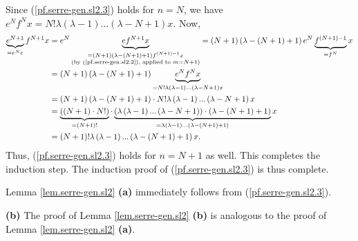 \documentclass[etingof-lie.tex]{subfiles}
\begin{document}
Since (\ref{pf.serre-gen.sl2.3}) holds for $n=N$, we have $e^{N}%
f^{N}x=N!\lambda\left(  \lambda-1\right)  ...\left(  \lambda-N+1\right)  x$.
Now,%
\begin{align*}
\underbrace{e^{N+1}}_{=e^{N}e}f^{N+1}x  &  =e^{N}\underbrace{ef^{N+1}%
x}_{\substack{=\left(  N+1\right)  \left(  \lambda-\left(  N+1\right)
+1\right)  f^{\left(  N+1\right)  -1}x\\\text{(by (\ref{pf.serre-gen.sl2.2}),
applied to }m=N+1\text{)}}}=\left(  N+1\right)  \left(  \lambda-\left(
N+1\right)  +1\right)  e^{N}\underbrace{f^{\left(  N+1\right)  -1}}_{=f^{N}%
}x\\
&  =\left(  N+1\right)  \left(  \lambda-\left(  N+1\right)  +1\right)
\underbrace{e^{N}f^{N}x}_{=N!\lambda\left(  \lambda-1\right)  ...\left(
\lambda-N+1\right)  x}\\
&  =\left(  N+1\right)  \left(  \lambda-\left(  N+1\right)  +1\right)  \cdot
N!\lambda\left(  \lambda-1\right)  ...\left(  \lambda-N+1\right)  x\\
&  =\underbrace{\left(  \left(  N+1\right)  \cdot N!\right)  }_{=\left(
N+1\right)  !}\cdot\underbrace{\left(  \lambda\left(  \lambda-1\right)
...\left(  \lambda-N+1\right)  \right)  \cdot\left(  \lambda-\left(
N+1\right)  +1\right)  }_{=\lambda\left(  \lambda-1\right)  ...\left(
\lambda-\left(  N+1\right)  +1\right)  }x\\
&  =\left(  N+1\right)  !\lambda\left(  \lambda-1\right)  ...\left(
\lambda-\left(  N+1\right)  +1\right)  x.
\end{align*}
Thus, (\ref{pf.serre-gen.sl2.3}) holds for $n=N+1$ as well. This completes the
induction step. The induction proof of (\ref{pf.serre-gen.sl2.3}) is thus complete.

Lemma \ref{lem.serre-gen.sl2} \textbf{(a)} immediately follows from
(\ref{pf.serre-gen.sl2.3}).

\textbf{(b)} The proof of Lemma \ref{lem.serre-gen.sl2} \textbf{(b)} is
analogous to the proof of Lemma \ref{lem.serre-gen.sl2} \textbf{(a)}.
\end{document}
